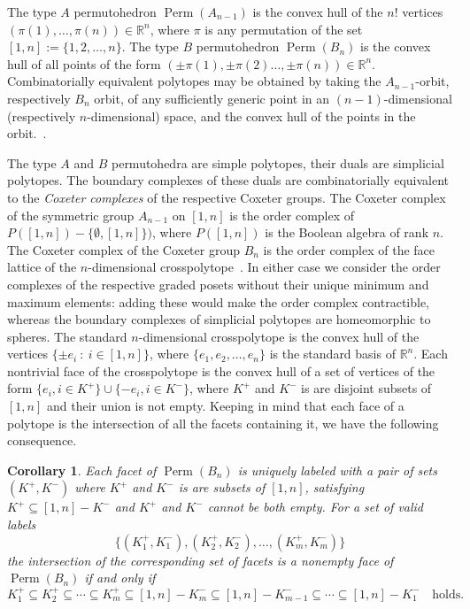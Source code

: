 \documentclass[reqno,12pt]{amsart}
\numberwithin{equation}{section}
\newtheorem{corollary}[theorem]{Corollary}
\newcommand{\0}{\widehat{0}}
\newcommand{\1}{\widehat{1}}
\newcommand{\2}{\widehat{2}}
\begin{document}
The type $A$ permutohedron $\operatorname{Perm}(A_{n-1})$ is the convex
hull of the $n!$ vertices\\ $(\pi(1),\ldots,\pi(n))\in\mathbb{R}^n$, where
$\pi$ is any permutation of the set
$[1,n]:=\{1,2,\ldots,n\}$. The type $B$ permutohedron
$\operatorname{Perm}(B_{n})$ is the convex hull of all points of the form
$(\pm \pi(1),\pm
\pi(2)\ldots,\pm\pi(n))\in\mathbb{R}^n$. Combinatorially equivalent
polytopes may be obtained by taking the $A_{n-1}$-orbit, respectively
$B_n$ orbit, of any sufficiently generic point in an $(n-1)$-dimensional
(respectively $n$-dimensional) space, and the convex hull of the points
in the orbit.~\cite[Section 2]{Fomin-Reading}.

The type $A$ and $B$ permutohedra are simple polytopes, their duals are
simplicial polytopes. The boundary complexes of these duals are
combinatorially equivalent to the {\em Coxeter complexes} of 
the respective Coxeter groups. The Coxeter complex of the symmetric
group $A_{n-1}$ on $[1,n]$ is the order complex of
$P([1,n])-\{\emptyset,[1,n]\})$, where $P([1,n])$ is the Boolean algebra
of rank $n$. The Coxeter complex of the Coxeter group $B_n$ is the
order complex of the face lattice of the $n$-dimensional
crosspolytope~\cite[Lecture 1]{Wachs-pt}. In either case we consider
the order complexes of the respective graded posets without their unique
minimum and maximum elements: adding these would make the order complex
contractible, whereas the boundary complexes of simplicial polytopes are
homeomorphic to spheres. The standard $n$-dimensional crosspolytope
is the convex hull of the vertices $\{\pm e_i\::\: i\in [1,n]\}$, where
$\{e_1,e_2,\ldots,e_n\}$ is the standard basis of ${\mathbb R^n}$. Each
nontrivial face of the crosspolytope is the convex hull of a set of
vertices of the form $\{e_i, i\in K^+\}\cup \{-e_i, i\in K^-\}$, where
$K^+$ and $K^-$ is are disjoint subsets of $[1,n]$ and their union is
not empty. Keeping in mind that each face of a polytope is the
intersection of all the facets containing it, we have the following
consequence. 


\begin{corollary}
\label{cor:facesintervals}  
Each facet of $\operatorname{Perm}(B_{n})$ is uniquely labeled with a
pair of sets $(K^+,K^-)$ where $K^+$ and $K^-$ is are subsets
of $[1,n]$, satisfying $K^+\subseteq [1,n]-K^-$ and $K^+$ and $K^-$
cannot be both empty. For a set of valid labels
  $$\{(K_1^+,K_1^-),(K_2^+,K_2^-),\ldots, (K_m^+,K_m^-)\}$$
the intersection of the corresponding set of
facets is a nonempty face of $\operatorname{Perm}(B_{n})$ if and only if 
$$
K_1^+\subseteq K_2^+\subseteq \cdots \subseteq K_m^+ \subseteq
[1,n]-K_m^- \subseteq [1,n]-K_{m-1}^- \subseteq \cdots 
\subseteq [1,n]- K_1^-\quad\mbox{holds.}   
$$
\end{corollary}  
\end{document}

